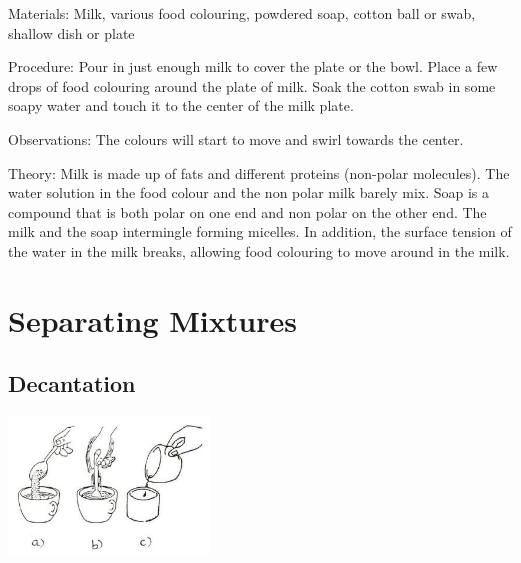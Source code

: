 \begin{multicols}{2}
\begin{description*}
\item[Materials:]{Milk, various food colouring, powdered soap, cotton ball or swab, shallow dish or plate}
\item[Procedure:]{Pour in just enough milk to cover the plate or the bowl. Place a few drops of
food colouring around the plate of milk. Soak
the cotton swab in some soapy water and touch it to the center of the
milk plate. }
\item[Observations:]{The colours will start to move and
swirl towards the center.}
\item[Theory:]{Milk is made up of fats and different proteins (non-polar molecules). The water solution in the food colour and the non polar milk barely mix. Soap
is a compound that is both polar on one end and non polar on the other
end. The milk and the soap intermingle forming micelles. In addition,
the surface tension of the water in the milk breaks, allowing
food colouring to move around in the milk. }
\end{description*}


\section*{Separating Mixtures}


\subsection{Decantation}

\begin{center}
\includegraphics[width=0.4\textwidth]{./img/source/decantation.jpg}
\end{center}


\end{multicols}
